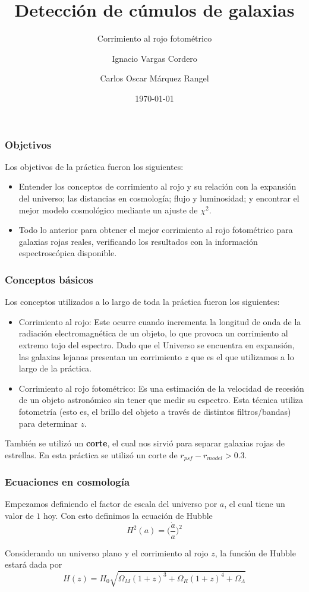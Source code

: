 \documentclass{beamer}
\title
{Detección de cúmulos de galaxias}
\subtitle{Corrimiento al rojo fotométrico}
\author[Vargas, Márquez]
{Ignacio Vargas Cordero \and Carlos Oscar Márquez Rangel}
\institute[]
{
	\inst{}
	Facultad de Ciencias\\
	UNAM
}
\date[26/02/18]
{\today}
\begin{document}
	
	\frame{\titlepage}
	
	\begin{frame}
		\frametitle{Objetivos}
		Los objetivos de la práctica fueron los siguientes:
		\begin{itemize}
			\item Entender los conceptos de corrimiento al rojo y su relación con la expansión del universo; las distancias en cosmología; flujo y luminosidad; y encontrar el mejor modelo cosmológico mediante un ajuste de $\chi^2$.
			\item Todo lo anterior para obtener el mejor corrimiento al rojo fotométrico para galaxias rojas reales, verificando los resultados con la información espectroscópica disponible.
		\end{itemize}
    \end{frame}

\begin{frame}
\frametitle{Conceptos básicos}
Los conceptos utilizados a lo largo de toda la práctica fueron los siguientes:
\begin{itemize}
	\item Corrimiento al rojo: Este ocurre cuando incrementa la longitud de onda de la radiación electromagnética de un objeto, lo que provoca un corrimiento al extremo tojo del espectro. Dado que el Universo se encuentra en expansión, las galaxias lejanas presentan un corrimiento $z$ que es el que utilizamos a lo largo de la práctica.
	\item Corrimiento al rojo fotométrico: Es una estimación de la velocidad de recesión de un objeto astronómico sin tener que medir su espectro. Esta técnica utiliza fotometría (esto es, el brillo del objeto a través de distintos filtros/bandas) para determinar $z$.
\end{itemize}
También se utilizó un \textbf{corte}, el cual nos sirvió para separar galaxias rojas de estrellas. En esta práctica se utilizó un corte de $r_{psf} - r_{model} > 0.3$.
\end{frame}

	\begin{frame}
\frametitle{Ecuaciones en cosmología}
Empezamos definiendo el factor de escala del universo por $a$, el cual tiene un valor de $1$ hoy. Con esto definimos la ecuación de Hubble
$$H^2(a)=\bigg(\frac{\dot{a}}{a}\bigg)^2$$

Considerando un universo plano y el corrimiento al rojo $z$, la función de Hubble estará dada por
$$H(z)=H_0\sqrt{\Omega_M(1+z)^3+\Omega_R(1+z)^4+\Omega_\Lambda}$$


\end{frame}
\end{document}
